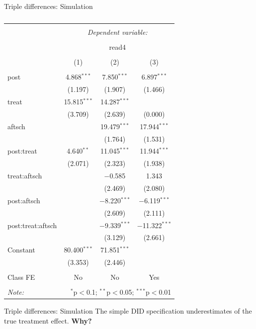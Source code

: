 \documentclass[
  ignorenonframetext,
]{beamer}
\begin{document}
\begin{frame}[fragile]{Triple differences: Simulation}
\begin{table}[!htbp] \centering 
  \caption{} 
  \label{} 
\begin{tabular}{@{\extracolsep{5pt}}lccc} 
\\[-1.8ex]\hline 
\hline \\[-1.8ex] 
 & \multicolumn{3}{c}{\textit{Dependent variable:}} \\ 
\cline{2-4} 
\\[-1.8ex] & \multicolumn{3}{c}{read4} \\ 
\\[-1.8ex] & (1) & (2) & (3)\\ 
\hline \\[-1.8ex] 
 post & 4.868$^{***}$ & 7.850$^{***}$ & 6.897$^{***}$ \\ 
  & (1.197) & (1.907) & (1.466) \\ 
  treat & 15.815$^{***}$ & 14.287$^{***}$ &  \\ 
  & (3.709) & (2.639) & (0.000) \\ 
  aftsch &  & 19.479$^{***}$ & 17.944$^{***}$ \\ 
  &  & (1.764) & (1.531) \\ 
  post:treat & 4.640$^{**}$ & 11.045$^{***}$ & 11.944$^{***}$ \\ 
  & (2.071) & (2.323) & (1.938) \\ 
  treat:aftsch &  & $-$0.585 & 1.343 \\ 
  &  & (2.469) & (2.080) \\ 
  post:aftsch &  & $-$8.220$^{***}$ & $-$6.119$^{***}$ \\ 
  &  & (2.609) & (2.111) \\ 
  post:treat:aftsch &  & $-$9.339$^{***}$ & $-$11.322$^{***}$ \\ 
  &  & (3.129) & (2.661) \\ 
  Constant & 80.400$^{***}$ & 71.851$^{***}$ &  \\ 
  & (3.353) & (2.446) &  \\ 
 \hline \\[-1.8ex] 
Class FE & No & No & Yes \\ 
\hline 
\hline \\[-1.8ex] 
\textit{Note:}  & \multicolumn{3}{r}{$^{*}$p$<$0.1; $^{**}$p$<$0.05; $^{***}$p$<$0.01} \\ 
\end{tabular} 
\end{table}
\end{frame}

\begin{frame}{Triple differences: Simulation}
\protect\hypertarget{triple-differences-simulation-4}{}
The simple DID specification underestimates of the true treatment
effect. \textbf{Why?}
\end{frame}
\end{document}
